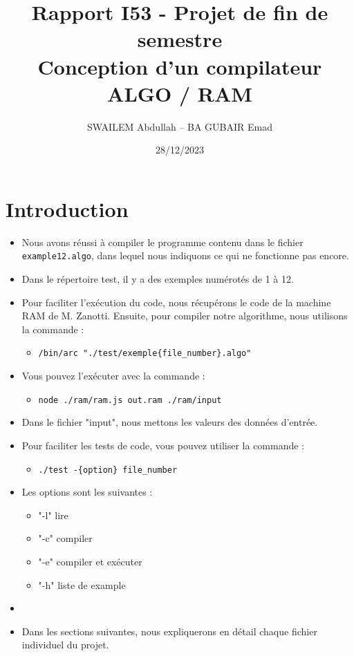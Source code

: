 \documentclass[a4paper,10pt]{article}
\title{Rapport I53 - Projet de fin de semestre\\Conception d'un compilateur ALGO / RAM}
\author{SWAILEM Abdullah – BA GUBAIR Emad}
\date{28/12/2023}
\begin{document}
\maketitle

\section*{Introduction}
\begin{itemize}
    \item Nous avons réussi à compiler le programme contenu dans le fichier \texttt{example12.algo}, dans lequel nous indiquons ce qui ne fonctionne pas encore.
    \item Dans le répertoire test, il y a des exemples numérotés de 1 à 12.
    \item Pour faciliter l'exécution du code, nous récupérons le code de la machine RAM de M. Zanotti. Ensuite, pour compiler notre algorithme, nous utilisons la commande :
    \begin{itemize}
        \item \texttt{/bin/arc "./test/exemple\{file\_number\}.algo"}
    \end{itemize}



    \item Vous pouvez l'exécuter avec la commande :
        \begin{itemize}
            \item  \texttt{node ./ram/ram.js out.ram ./ram/input}
        \end{itemize}
    \item Dans le fichier "input", nous mettons les valeurs des données d'entrée.

    \item Pour faciliter les tests de code, vous pouvez utiliser la commande :
    \begin{itemize}
        \item \texttt{./test -\{option\} file\_number}
    \end{itemize}

\item Les options sont les suivantes :

    \begin{itemize}
       \item "-l"  lire
       \item  "-c"  compiler
       \item "-e"  compiler et exécuter
       \item "-h"  liste de example

    \end{itemize}
\item

\item Dans les sections suivantes, nous expliquerons en détail chaque fichier individuel du projet.
\end{itemize}
\end{document}
